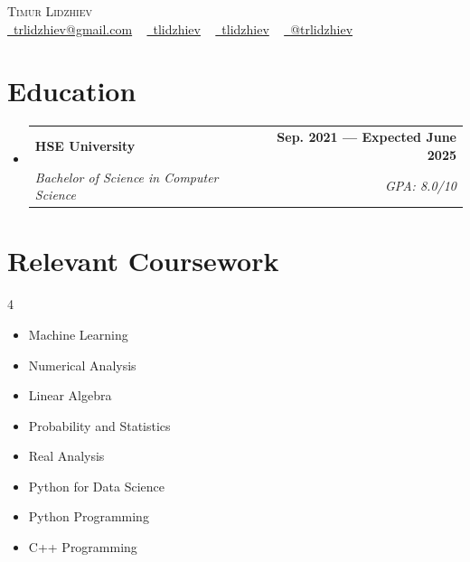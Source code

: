 \documentclass[letterpaper,11pt]{article}
\makeatletter
\newcommand{\resumeSubheading}[4]{
  \vspace{-2pt}\item
    \begin{tabular*}{1.0\textwidth}[t]{l@{\extracolsep{\fill}}r}
      \textbf{#1} & \textbf{\small #2} \\
      \textit{\small#3} & \textit{\small #4} \\
    \end{tabular*}\vspace{-7pt}
}
\newcommand{\resumeSubHeadingListStart}{\begin{itemize}[leftmargin=0.0in, label={}]}
\newcommand{\resumeSubHeadingListEnd}{\end{itemize}}
\makeatother
\begin{document}
\begin{center}
    {\Huge \scshape Timur Lidzhiev} \\ \vspace{1pt}
     \href{mailto:x@gmail.com}{\raisebox{-0.2\height}\faEnvelope\  trlidzhiev@gmail.com} ~
    \href{https://linkedin.com/in/tlidzhiev}{\raisebox{-0.2\height}\faLinkedin\ tlidzhiev}  ~
    \href{https://github.com/tlidzhiev}{\raisebox{-0.2\height}\faGithub\ tlidzhiev} ~ \href{https://t.me/trlidzhiev}{\raisebox{-0.05\height}\faTelegram \ @trlidzhiev}
    \vspace{-8pt}
\end{center}


\section{Education}
  \resumeSubHeadingListStart
    \resumeSubheading
      {HSE University}{Sep. 2021 --- Expected June 2025}
      {Bachelor of Science in Computer Science}{GPA: 8.0/10}
  \resumeSubHeadingListEnd

\section{Relevant Coursework}
        \begin{multicols}{4}
            \begin{itemize}[itemsep=-5pt, parsep=3pt]
                \item Machine Learning
                \item Numerical Analysis
                \item Linear Algebra
                \item\small Probability and Statistics
                \item Real Analysis
                \item\small Python for Data Science
                \item Python Programming
                \item C++ Programming
            \end{itemize}
        \end{multicols}
        \vspace*{2.0\multicolsep}

\end{document}
